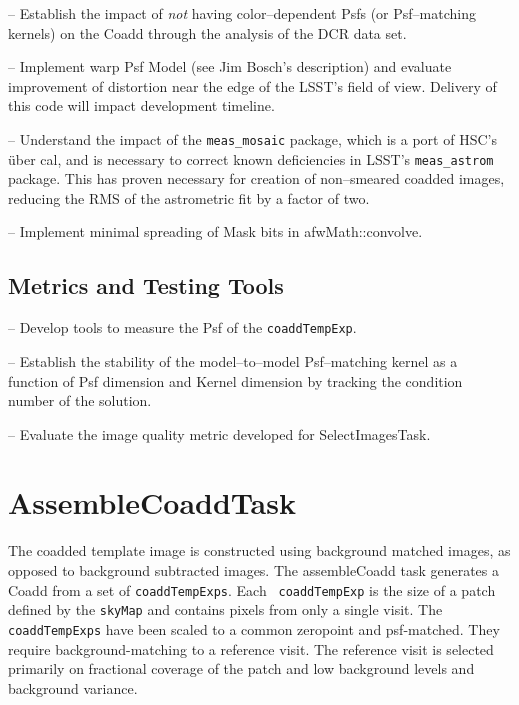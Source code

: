 \documentclass[prd, nofootinbib, floatfix, 11pt,tightenlines,times]{article}
\begin{document}
-- Establish the impact of {\it not} having color--dependent Psfs (or
Psf--matching kernels) on the Coadd through the analysis of the DCR
data set.

-- Implement warp Psf Model (see Jim Bosch's description) and evaluate
improvement of distortion near the edge of the LSST's field of
view. Delivery of this code will impact development timeline.

-- Understand the impact of the {\tt meas\_mosaic} package, which is a
port of HSC's \"{u}ber cal, and is necessary to correct known
deficiencies in LSST's {\tt meas\_astrom} package.  This has proven
necessary for creation of non--smeared coadded images, reducing the
RMS of the astrometric fit by a factor of two.

-- Implement minimal spreading of Mask bits in afwMath::convolve.

%
%
%
%
%

\subsection{Metrics and Testing Tools}

-- Develop tools to measure the Psf of the {\tt coaddTempExp}.

-- Establish the stability of the model--to--model Psf--matching
kernel as a function of Psf dimension and Kernel dimension by tracking
the condition number of the solution.

-- Evaluate the image quality metric developed for SelectImagesTask.


\section{AssembleCoaddTask} 

The coadded template image is constructed using background matched
images, as opposed to background subtracted images. The assembleCoadd
task generates a Coadd from a set of {\tt coaddTempExps}.  Each {\tt
  coaddTempExp} is the size of a patch defined by the {\tt skyMap} and
contains pixels from only a single visit.  The {\tt coaddTempExps}
have been scaled to a common zeropoint and psf-matched.  They require
background-matching to a reference visit. The reference visit is
selected primarily on fractional coverage of the patch and low
background levels and background variance.
\end{document}
